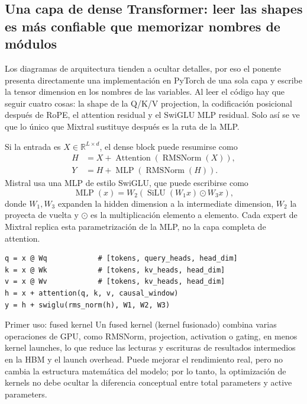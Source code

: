 \subsection{Una capa de dense Transformer: leer las shapes es más confiable que memorizar nombres de módulos}

Los diagramas de arquitectura tienden a ocultar detalles, por eso el ponente presenta directamente una implementación en PyTorch de una sola capa y escribe la tensor dimension en los nombres de las variables. Al leer el código hay que seguir cuatro cosas: la shape de la Q/K/V projection, la codificación posicional después de RoPE, el attention residual y el SwiGLU MLP residual. Solo así se ve que lo único que Mixtral sustituye después es la ruta de la MLP.


Si la entrada es $X\in\mathbb{R}^{L\times d}$, el dense block puede resumirse como
\begin{align*}
H &= X+\operatorname{Attention}(\operatorname{RMSNorm}(X)),\\
Y &= H+\operatorname{MLP}(\operatorname{RMSNorm}(H)).
\end{align*}
Mistral usa una MLP de estilo SwiGLU, que puede escribirse como
\[
\operatorname{MLP}(x)=W_2\left(\operatorname{SiLU}(W_1x)\odot W_3x\right),
\]
donde $W_1,W_3$ expanden la hidden dimension a la intermediate dimension, $W_2$ la proyecta de vuelta y $\odot$ es la multiplicación elemento a elemento. Cada expert de Mixtral replica esta parametrización de la MLP, no la capa completa de attention.

\begin{lstlisting}[caption={Pseudocódigo shape-first de un Dense Transformer block}]
q = x @ Wq            # [tokens, query_heads, head_dim]
k = x @ Wk            # [tokens, kv_heads, head_dim]
v = x @ Wv            # [tokens, kv_heads, head_dim]
h = x + attention(q, k, v, causal_window)
y = h + swiglu(rms_norm(h), W1, W2, W3)
\end{lstlisting}

\begin{knowledgebox}{Primer uso: fused kernel}
Un fused kernel (kernel fusionado) combina varias operaciones de GPU, como RMSNorm, projection, activation o gating, en menos kernel launches, lo que reduce las lecturas y escrituras de resultados intermedios en la HBM y el launch overhead. Puede mejorar el rendimiento real, pero no cambia la estructura matemática del modelo; por lo tanto, la optimización de kernels no debe ocultar la diferencia conceptual entre total parameters y active parameters.
\end{knowledgebox}

